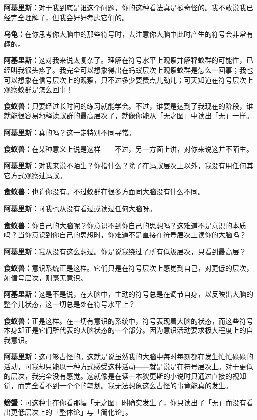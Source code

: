 \documentclass[
  12pt,
  twoside,
  openright,
  oldfontcommands,
]{memoir}
\newcommand{\dialogname}[1]{{\heifamily\bfseries #1}}
\begin{document}
\dialogname{阿基里斯：}对于我到底是谁这个问题，你的这种看法真是挺奇怪的。我不敢说我已经完全理解了，但我会好好考虑它们的。

\dialogname{乌龟：}在你思考你大脑中的那些符号时，去注意你大脑中此时产生的符号会非常有趣的。

\dialogname{阿基里斯：}这对我来说太复杂了。理解在符号水平上观察并解释蚁群的可能性，已经叫我很头疼了。我完全可以想象得出在蚂蚁层次上观察蚁群是怎么一回事；我也可以想象在信号层次上的观察，只不过多少要费点儿劲儿；可天知道在符号层次上观察蚁群是怎么回事！

\dialogname{食蚁兽：}只要经过长时间的练习就能学会。不过，谁要是达到了我现在的阶段，谁就能很容易地释读蚁群的最高层次了，就像你能从「无之图」中读出「无」一样。

\dialogname{阿基里斯：}真的吗？这一定特别不同寻常。

\dialogname{食蚁兽：}在某种意义上说是这样------不过，另一方面上讲，对你来说这并不陌生。

\dialogname{阿基里斯：}对我来说不陌生？你指什么？除了在蚂蚁层次上以外，我没有用任何其它方式观察过蚂蚁。

\dialogname{食蚁兽：}也许你没有。不过蚁群在很多方面同大脑没有什么不同。

\dialogname{阿基里斯：}可我也从没有看过或读过任何大脑呀。

\dialogname{食蚁兽：}你自己的大脑呢？你意识不到你自己的思想吗？这难道不是意识的本质吗？当你意识到你自己的思想时，你难道不是直接在符号层次上读你的大脑吗？

\dialogname{阿基里斯：}我从没有这么想过。你是说我绕过了所有低级层次，只看到最高层？

\dialogname{食蚁兽：}意识系统正是这样。它们只是在符号层次上感觉到自己，对更低的层次，如信号层次，则毫无意识。

\dialogname{阿基里斯：}这是不是说，在大脑中，主动的符号总是在调节自身，以反映出大脑的整个儿状态，这一切总是处在符号水平上？

\dialogname{食蚁兽：}正是这样。在一切有意识的系统中，符号表现着大脑的状态，而这些符号本身却正是它们所代表的大脑状态的一个部分。因为意识活动要求极大程度上的自我意识。

\dialogname{阿基里斯：}这可够古怪的。这就是说虽然我的大脑中每时每刻都在发生忙忙碌碌的活动，可我却只能以一种方式感受这种活动------就是说是在符号层次上。对于更低的层次，我完全没有感觉。这就像是在读一本狄更斯的小说时只通过直接的视知觉，而完全看不到一个个的笔划。我无法想象这么古怪的事竟能真的发生。

\dialogname{螃蟹：}可这种事在你看那幅「无之图」时确实发生了，你只读出了「无」而没有看出更低层次上的「整体论」与「简化论」。
\end{document}
